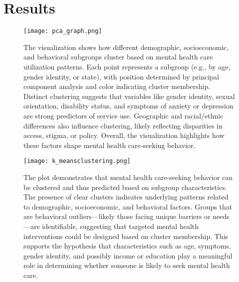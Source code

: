 \documentclass{article}
\begin{document}
\section{Results}
\begin{figure}[H]
    
    \centering
    \begin{adjustbox}{max width=\textwidth}
    \texttt{[image: pca\_graph.png]}
    \end{adjustbox}
    \caption{The visualization shows how different demographic, socioeconomic, and behavioral subgroups cluster based on mental health care utilization patterns. Each point represents a subgroup (e.g., by age, gender identity, or state), with position determined by principal component analysis and color indicating cluster membership. Distinct clustering suggests that variables like gender identity, sexual orientation, disability status, and symptoms of anxiety or depression are strong predictors of service use. Geographic and racial/ethnic differences also influence clustering, likely reflecting disparities in access, stigma, or policy. Overall, the visualization highlights how these factors shape mental health care-seeking behavior.}
    \label{fig:yourlabel}
\end{figure}

\begin{figure}[H]
    
    \centering
    \begin{adjustbox}{max width=\textwidth}
    \texttt{[image: k\_meansclustering.png]}
    \end{adjustbox}

        \caption{The plot demonstrates that mental health care-seeking behavior can be clustered and thus predicted based on subgroup characteristics. The presence of clear clusters indicates underlying patterns related to demographic, socioeconomic, and behavioral factors. Groups that are behavioral outliers—likely those facing unique barriers or needs—are identifiable, suggesting that targeted mental health interventions could be designed based on cluster membership. This supports the hypothesis that characteristics such as age, symptoms, gender identity, and possibly income or education play a meaningful role in determining whether someone is likely to seek mental health care.}
        \label{fig:yourlabel}
    \end{figure}
    
\end{document}
